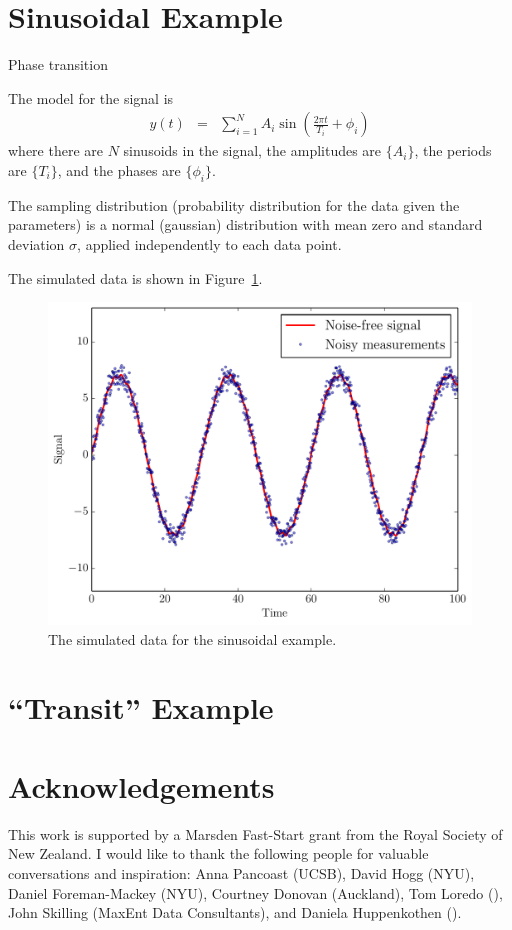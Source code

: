 \documentclass[letterpaper, 11pt]{article}
\begin{document}
\section{Sinusoidal Example}
Phase transition

The model for the signal is
\begin{eqnarray}
y(t) &=& \sum_{i=1}^N A_i \sin \left(\frac{2\pi t}{T_i} + \phi_i\right)
\end{eqnarray}
where there are $N$ sinusoids in the signal, the
amplitudes are $\{A_i\}$, the periods are $\{T_i\}$, and the phases are
$\{\phi_i\}$.

The sampling distribution (probability distribution for the data given the
parameters) is a normal (gaussian) distribution with mean zero and standard
deviation $\sigma$, applied independently to each data point.

The simulated data is shown in Figure~\ref{fig:sinewave_data}.

\begin{figure}
\begin{center}
\includegraphics[scale=0.5]{sinewave_data.pdf}
\caption{The simulated data for the sinusoidal example.
\label{fig:sinewave_data}}
\end{center}
\end{figure}


\section{``Transit'' Example}




\section*{Acknowledgements}
This work is supported by a Marsden Fast-Start grant
from the Royal Society of New Zealand. I would like to thank the following
people for valuable conversations and inspiration:
Anna Pancoast (UCSB), David Hogg (NYU), Daniel Foreman-Mackey (NYU),
Courtney Donovan (Auckland), Tom Loredo (),
John Skilling (MaxEnt Data Consultants), and Daniela Huppenkothen ().
\end{document}
